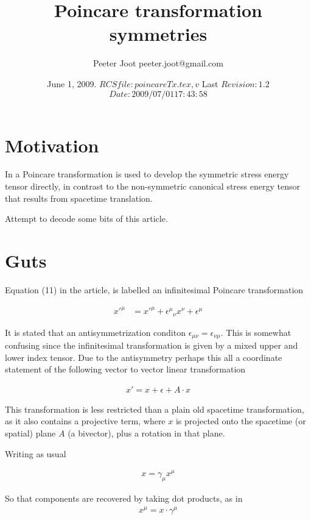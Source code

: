 \documentclass{article}
\title{Poincare transformation symmetries}
\author{Peeter Joot \quad peeter.joot@gmail.com }
\date{ June 1, 2009.  $RCSfile: poincareTx.tex,v $ Last $Revision: 1.2 $ $Date: 2009/07/01 17:43:58 $ }
\begin{document}
\maketitle{}
\tableofcontents
\section{Motivation}

In \cite{montesinos2006sem} a Poincare transformation is used to 
develop the symmetric stress energy tensor directly, in contrast to the
non-symmetric canonical stress energy tensor that results from 
spacetime translation.

Attempt to decode some bits of this article.

\section{Guts}

Equation (11) in the article, is labelled an infinitesimal Poincare
transformation

\begin{align}\label{eqn:txComponents}
{x'}^\mu
&=
{x'}^\mu
+ {{\epsilon}^\mu}_\nu x^\nu
+ {\epsilon}^\mu
\end{align}

It is stated that an antisymmetrization conditon $\epsilon_{\mu\nu} = \epsilon_{\nu\mu}$.  This is somewhat confusing 
since the infinitesimal transformation is given by a mixed upper and lower index tensor.   Due to the antisymmetry
perhaps this all a coordinate statement of the following vector to vector linear transformation

\begin{align}\label{eqn:blah}
x' = x + \epsilon + A \cdot x
\end{align}

This transformation is less restricted than a plain old spacetime transformation, as it also contains a projective term, where $x$ is projected onto the spacetime (or spatial) plane $A$ (a bivector), plus a rotation in that plane.

Writing as usual

\begin{align*}
x = \gamma_\mu x^\mu
\end{align*}

So that components are recovered by taking dot products, as in
\begin{align*}
x^\mu = x \cdot \gamma^\mu
\end{align*}
\end{document}
